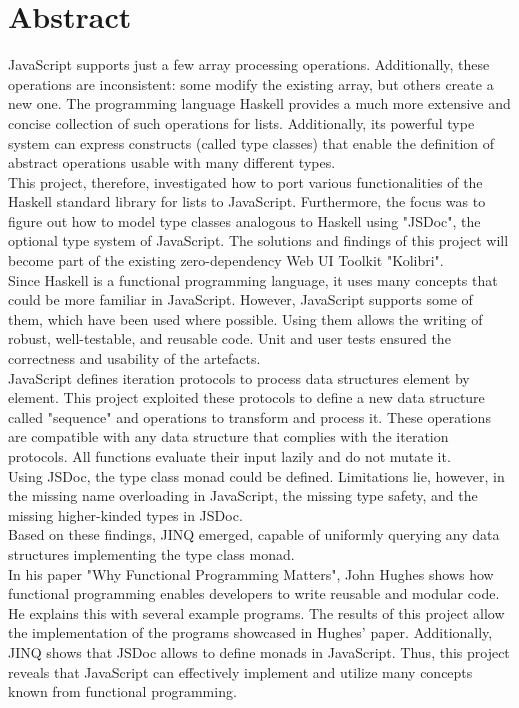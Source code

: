\chapter*{Abstract}
\thispagestyle{empty}
JavaScript supports just a few array processing operations.
Additionally, these operations are inconsistent: some modify the existing
array, but others create a new one. The programming language Haskell provides a
much more extensive and concise collection of such operations for
lists. Additionally, its powerful type system can express
constructs (called type classes) that enable the definition of abstract
operations usable with many different types.\\ 
This project, therefore, investigated how to port various functionalities of
the Haskell standard library for lists to JavaScript. Furthermore, the focus
was to figure out how to model type classes analogous to Haskell using "JSDoc",
the optional type system of JavaScript. The solutions and
findings of this project will become part of the existing zero-dependency Web
UI Toolkit "Kolibri". \\
Since Haskell is a functional programming language, it uses many concepts that
could be more familiar in JavaScript. However, JavaScript supports some of them,
which have been used where possible. Using them allows the writing
of robust, well-testable, and reusable code. Unit and user tests ensured the
correctness and usability of the artefacts. \\
JavaScript defines iteration protocols to process data structures element by
element. This project exploited these protocols to define a new data structure
called "sequence" and operations to transform and process it. These operations
are compatible with any data structure that complies with the iteration
protocols. All functions evaluate their input lazily and do not mutate it.\\
Using JSDoc, the type class monad could be defined. Limitations lie, however,
in the missing name overloading in JavaScript, the missing type safety, and the
missing higher-kinded types in JSDoc.\\
Based on these findings, JINQ emerged, capable of uniformly querying any data
structures implementing the type class monad.\\
In his paper "Why Functional Programming Matters", John Hughes shows how
functional programming enables developers to write reusable and modular
code. He explains this with several example programs.
The results of this project allow the implementation of the programs showcased
in Hughes' paper. Additionally, JINQ shows that JSDoc allows to define
monads in JavaScript. Thus, this project reveals that JavaScript can
effectively implement and utilize many concepts known from functional
programming.

